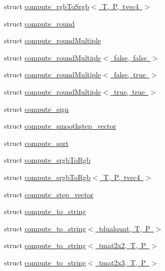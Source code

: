 \begin{DoxyCompactItemize}
struct \mbox{\hyperlink{structglm_1_1detail_1_1compute__rgb_to_srgb_3_01_t_00_01_p_00_01tvec4_01_4}{compute\+\_\+rgb\+To\+Srgb$<$ T, P, tvec4 $>$}}
\item 
struct \mbox{\hyperlink{structglm_1_1detail_1_1compute__round}{compute\+\_\+round}}
\item 
struct \mbox{\hyperlink{structglm_1_1detail_1_1compute__round_multiple}{compute\+\_\+round\+Multiple}}
\item 
struct \mbox{\hyperlink{structglm_1_1detail_1_1compute__round_multiple_3_01false_00_01false_01_4}{compute\+\_\+round\+Multiple$<$ false, false $>$}}
\item 
struct \mbox{\hyperlink{structglm_1_1detail_1_1compute__round_multiple_3_01false_00_01true_01_4}{compute\+\_\+round\+Multiple$<$ false, true $>$}}
\item 
struct \mbox{\hyperlink{structglm_1_1detail_1_1compute__round_multiple_3_01true_00_01true_01_4}{compute\+\_\+round\+Multiple$<$ true, true $>$}}
\item 
struct \mbox{\hyperlink{structglm_1_1detail_1_1compute__sign}{compute\+\_\+sign}}
\item 
struct \mbox{\hyperlink{structglm_1_1detail_1_1compute__smoothstep__vector}{compute\+\_\+smoothstep\+\_\+vector}}
\item 
struct \mbox{\hyperlink{structglm_1_1detail_1_1compute__sqrt}{compute\+\_\+sqrt}}
\item 
struct \mbox{\hyperlink{structglm_1_1detail_1_1compute__srgb_to_rgb}{compute\+\_\+srgb\+To\+Rgb}}
\item 
struct \mbox{\hyperlink{structglm_1_1detail_1_1compute__srgb_to_rgb_3_01_t_00_01_p_00_01tvec4_01_4}{compute\+\_\+srgb\+To\+Rgb$<$ T, P, tvec4 $>$}}
\item 
struct \mbox{\hyperlink{structglm_1_1detail_1_1compute__step__vector}{compute\+\_\+step\+\_\+vector}}
\item 
struct \mbox{\hyperlink{structglm_1_1detail_1_1compute__to__string}{compute\+\_\+to\+\_\+string}}
\item 
struct \mbox{\hyperlink{structglm_1_1detail_1_1compute__to__string_3_01tdualquat_00_01_t_00_01_p_01_4}{compute\+\_\+to\+\_\+string$<$ tdualquat, T, P $>$}}
\item 
struct \mbox{\hyperlink{structglm_1_1detail_1_1compute__to__string_3_01tmat2x2_00_01_t_00_01_p_01_4}{compute\+\_\+to\+\_\+string$<$ tmat2x2, T, P $>$}}
\item 
struct \mbox{\hyperlink{structglm_1_1detail_1_1compute__to__string_3_01tmat2x3_00_01_t_00_01_p_01_4}{compute\+\_\+to\+\_\+string$<$ tmat2x3, T, P $>$}}

\end{DoxyCompactItemize}
